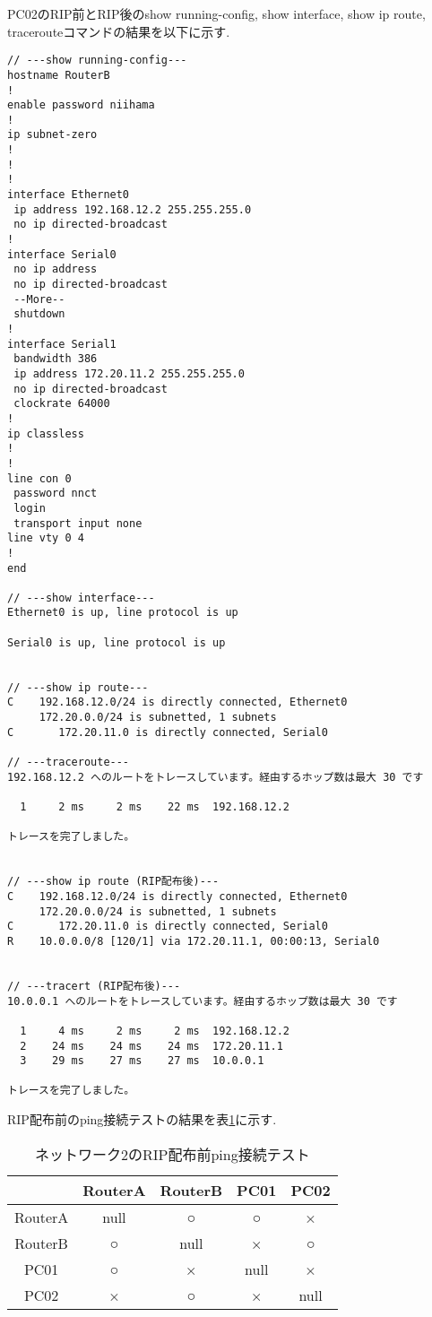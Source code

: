 \documentclass{jsarticle}
\begin{document}
PC02のRIP前とRIP後のshow running-config, show interface, show ip route, tracerouteコマンドの結果を以下に示す.

\begin{lstlisting}[basicstyle=\ttfamily\small, frame=single]
// ---show running-config---
hostname RouterB
!
enable password niihama
!
ip subnet-zero
!
!
!
interface Ethernet0
 ip address 192.168.12.2 255.255.255.0
 no ip directed-broadcast
!
interface Serial0
 no ip address
 no ip directed-broadcast
 --More--
 shutdown
!
interface Serial1
 bandwidth 386
 ip address 172.20.11.2 255.255.255.0
 no ip directed-broadcast
 clockrate 64000
!
ip classless
!
!
line con 0
 password nnct
 login
 transport input none
line vty 0 4
!
end

// ---show interface---
Ethernet0 is up, line protocol is up

Serial0 is up, line protocol is up


// ---show ip route---
C    192.168.12.0/24 is directly connected, Ethernet0
     172.20.0.0/24 is subnetted, 1 subnets
C       172.20.11.0 is directly connected, Serial0

// ---traceroute---
192.168.12.2 へのルートをトレースしています。経由するホップ数は最大 30 です

  1     2 ms     2 ms    22 ms  192.168.12.2

トレースを完了しました。


// ---show ip route (RIP配布後)---
C    192.168.12.0/24 is directly connected, Ethernet0
     172.20.0.0/24 is subnetted, 1 subnets
C       172.20.11.0 is directly connected, Serial0
R    10.0.0.0/8 [120/1] via 172.20.11.1, 00:00:13, Serial0


// ---tracert (RIP配布後)---
10.0.0.1 へのルートをトレースしています。経由するホップ数は最大 30 です

  1     4 ms     2 ms     2 ms  192.168.12.2
  2    24 ms    24 ms    24 ms  172.20.11.1
  3    29 ms    27 ms    27 ms  10.0.0.1

トレースを完了しました。
\end{lstlisting}

RIP配布前のping接続テストの結果を表\ref{tab:ping2_nonrip}に示す. 

\begin{table}[htb]
  \begin{center}
    \caption{ネットワーク2のRIP配布前ping接続テスト}
    \begin{tabular}{|c|c|c|c|c|} \hline
       &  RouterA & RouterB  & PC01 & PC02\\ \hline 
RouterA & null & ○ & ○ & × \\ \hline 
RouterB & ○ & null & × & ○ \\ \hline 
PC01 & ○ & × & null & × \\ \hline 
PC02 & × & ○ & × & null \\ \hline 
    \end{tabular}
	\label{tab:ping2_nonrip}
  \end{center}
\end{table}
\end{document}
